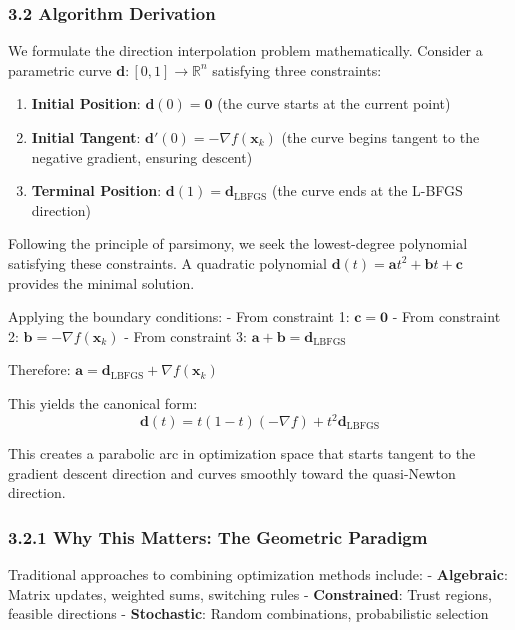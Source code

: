 \hypertarget{algorithm-derivation}{%
\subsubsection{3.2 Algorithm Derivation}\label{algorithm-derivation}}

We formulate the direction interpolation problem mathematically. Consider a parametric curve
\(\mathbf{d}: [0,1] \rightarrow \mathbb{R}^n\) satisfying three constraints:

\begin{enumerate}
\def\labelenumi{\arabic{enumi}.}
\item
  \textbf{Initial Position}: \(\mathbf{d}(0) = \mathbf{0}\) (the curve starts at the current point)
\item
  \textbf{Initial Tangent}: \(\mathbf{d}'(0) = -\nabla f(\mathbf{x}_k)\) (the curve begins tangent to the negative gradient, ensuring descent)
\item
  \textbf{Terminal Position}: \(\mathbf{d}(1) = \mathbf{d}_{\text{LBFGS}}\) (the curve ends at the L-BFGS direction)
\end{enumerate}

Following the principle of parsimony, we seek the lowest-degree polynomial satisfying these constraints.
A quadratic polynomial \(\mathbf{d}(t) = \mathbf{a}t^2 + \mathbf{b}t + \mathbf{c}\) provides the minimal solution.

Applying the boundary conditions:
- From constraint 1: \(\mathbf{c} = \mathbf{0}\)
- From constraint 2: \(\mathbf{b} = -\nabla f(\mathbf{x}_k)\)
- From constraint 3: \(\mathbf{a} + \mathbf{b} = \mathbf{d}_{\text{LBFGS}}\)

Therefore: \(\mathbf{a} = \mathbf{d}_{\text{LBFGS}} + \nabla f(\mathbf{x}_k)\)

This yields the canonical form:
\[\mathbf{d}(t) = t(1-t)(-\nabla f) + t^2 \mathbf{d}_{\text{LBFGS}}\]

This creates a parabolic arc in optimization space that starts tangent to the gradient descent direction and curves smoothly toward the quasi-Newton direction.

\hypertarget{why-this-matters-the-geometric-paradigm}{%
\subsubsection{3.2.1 Why This Matters: The Geometric Paradigm}\label{why-this-matters-the-geometric-paradigm}}

Traditional approaches to combining optimization methods include:
- \textbf{Algebraic}: Matrix updates, weighted sums, switching rules
- \textbf{Constrained}: Trust regions, feasible directions
- \textbf{Stochastic}: Random combinations, probabilistic selection

